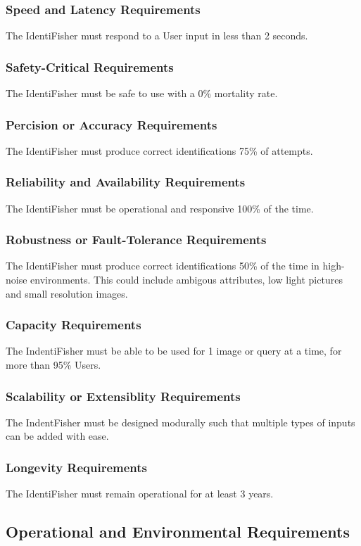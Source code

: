 \documentclass{article}
\begin{document}
\subsubsection{Speed and Latency Requirements}
The IdentiFisher must respond to a User input in less than 2 seconds.
\subsubsection{Safety-Critical Requirements}
The IdentiFisher must be safe to use with a 0\% mortality rate.
\subsubsection{Percision or Accuracy Requirements}
The IdentiFisher must produce correct identifications 75\% of attempts.
\subsubsection{Reliability and Availability Requirements}
The IdentiFisher must be operational and responsive 100\% of the time.
\subsubsection{Robustness or Fault-Tolerance Requirements}
The IdentiFisher must produce correct identifications 50\% of the time in high-noise environments. This could include
ambigous attributes, low light pictures and small resolution images.
\subsubsection{Capacity Requirements}
The IndentiFisher must be able to be used for 1 image or query at a time, for more than 95\% Users.
\subsubsection{Scalability or Extensiblity Requirements}
The IndentFisher must be designed modurally such that multiple types of inputs can be added with ease.
\subsubsection{Longevity Requirements}
The IdentiFisher must remain operational for at least 3 years.

\subsection{Operational and Environmental Requirements}
\end{document}

